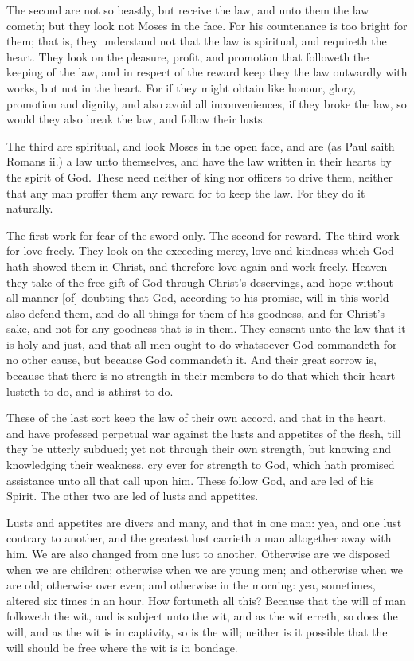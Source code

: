 The second are not so beastly, but receive the law, and 
unto them the law cometh; but they look not Moses in 
the face. For his countenance is too bright for them;
that is, they understand not that the law is spiritual, and 
requireth the heart. They look on the pleasure, profit, 
and promotion that followeth the keeping of the law, and 
in respect of the reward keep they the law outwardly with 
works, but not in the heart. For if they might obtain 
like honour, glory, promotion and dignity, and also avoid 
all inconveniences, if they broke the law, so would they 
also break the law, and follow their lusts. 

The third are spiritual, and look Moses in the open face,
and are (as Paul saith Romans ii.) a law unto themselves,
and have the law written in their hearts by the spirit of 
God. These need neither of king nor officers to drive 
them, neither that any man proffer them any reward for 
to keep the law. For they do it naturally.

The first work for fear of the sword only. The second 
for reward. The third work for love freely. They look 
on the exceeding mercy, love and kindness which God 
hath showed them in Christ, and therefore love again and 
work freely. Heaven they take of the free-gift of God 
through Christ's deservings, and hope without all manner 
[of] doubting that God, according to his promise, will in this 
world also defend them, and do all things for them of his 
goodness, and for Christ's sake, and not for any goodness 
that is in them. They consent unto the law that it is 
holy and just, and that all men ought to do whatsoever 
God commandeth for no other cause, but because God 
commandeth it. And their great sorrow is, because that 
there is no strength in their members to do that which 
their heart lusteth to do, and is athirst to do. 

These of the last sort keep the law of their own accord,
and that in the heart, and have professed perpetual 
war against the lusts and appetites of the flesh, till they 
be utterly subdued; yet not through their own strength, 
but knowing and knowledging their weakness, cry ever 
for strength to God, which hath promised assistance 
unto all that call upon him. These follow God, and are 
led of his Spirit. The other two are led of lusts and appetites.

Lusts and appetites are divers and many, and that in 
one man: yea, and one lust contrary to another, and the 
greatest lust carrieth a man altogether away with him. 
We are also changed from one lust to another. Otherwise
are we disposed when we are children; otherwise 
when we are young men; and otherwise when we are old;
otherwise over even; and otherwise in the morning: yea, 
sometimes, altered six times in an hour. How fortuneth 
all this? Because that the will of man followeth the wit,
and is subject unto the wit, and as the wit erreth, so does 
the will, and as the wit is in captivity, so is the will; 
neither is it possible that the will should be free where the 
wit is in bondage. 

